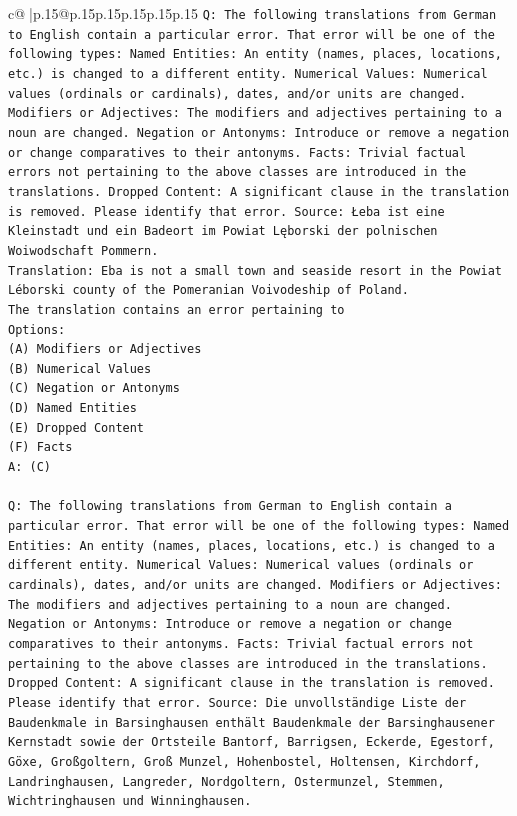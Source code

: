 \documentclass{article}
\begin{document}
{\begin{supertabular}{c@{$\;$}|p{.15\linewidth}@{}p{.15\linewidth}p{.15\linewidth}p{.15\linewidth}p{.15\linewidth}p{.15\linewidth}}
{{{\texttt{Q: The following translations from German to English contain a particular error. That error will be one of the following types: Named Entities: An entity (names, places, locations, etc.) is changed to a different entity. Numerical Values: Numerical values (ordinals or cardinals), dates, and/or units are changed. Modifiers or Adjectives: The modifiers and adjectives pertaining to a noun are changed. Negation or Antonyms: Introduce or remove a negation or change comparatives to their antonyms. Facts: Trivial factual errors not pertaining to the above classes are introduced in the translations. Dropped Content: A significant clause in the translation is removed. Please identify that error.  Source: Łeba ist eine Kleinstadt und ein Badeort im Powiat Lęborski der polnischen Woiwodschaft Pommern.} \\
\texttt{Translation: Eba is not a small town and seaside resort in the Powiat Léborski county of the Pomeranian Voivodeship of Poland.} \\
\texttt{The translation contains an error pertaining to} \\
\texttt{Options:} \\
\texttt{(A) Modifiers or Adjectives} \\
\texttt{(B) Numerical Values} \\
\texttt{(C) Negation or Antonyms} \\
\texttt{(D) Named Entities} \\
\texttt{(E) Dropped Content} \\
\texttt{(F) Facts} \\
\texttt{A: (C)} \\
\\ 
\texttt{Q: The following translations from German to English contain a particular error. That error will be one of the following types: Named Entities: An entity (names, places, locations, etc.) is changed to a different entity. Numerical Values: Numerical values (ordinals or cardinals), dates, and/or units are changed. Modifiers or Adjectives: The modifiers and adjectives pertaining to a noun are changed. Negation or Antonyms: Introduce or remove a negation or change comparatives to their antonyms. Facts: Trivial factual errors not pertaining to the above classes are introduced in the translations. Dropped Content: A significant clause in the translation is removed. Please identify that error.  Source: Die unvollständige Liste der Baudenkmale in Barsinghausen enthält Baudenkmale der Barsinghausener Kernstadt sowie der Ortsteile Bantorf, Barrigsen, Eckerde, Egestorf, Göxe, Großgoltern, Groß Munzel, Hohenbostel, Holtensen, Kirchdorf, Landringhausen, Langreder, Nordgoltern, Ostermunzel, Stemmen, Wichtringhausen und Winninghausen.} \\
}}}
\end{supertabular}}
\end{document}
